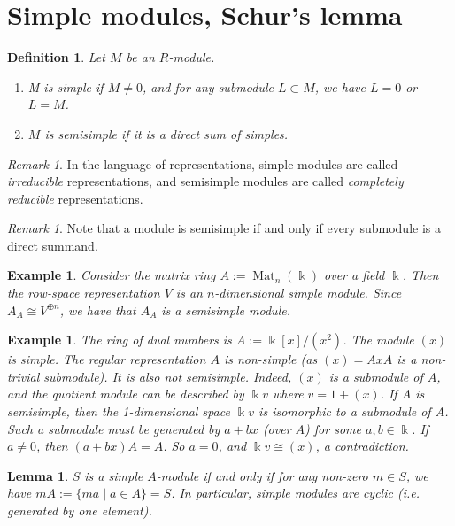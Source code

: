 \documentclass[11pt,a4paper]{article}
\makeatletter
\numberwithin{equation}{section}
\renewenvironment{proof}[1][\proofname]{\par
    \pushQED{\qed}%
    \normalfont \topsep0\p@\@plus6\p@ \labelsep1em\relax
    \trivlist
    \item[\hskip\labelsep\indent
        \bfseries #1]\ignorespaces
    \mbox{}
}{
    \popQED\endtrivlist\@endpefalse
}
\theoremstyle{all}
\newtheorem{lemma}[theorem]{Lemma}
\newtheorem{example}[theorem]{Example}
\newtheorem{definition}[theorem]{Definition}
\theoremstyle{remark}
\newtheorem{remark}[theorem]{Remark}
\newcommand{\Mat}{\operatorname{Mat}\nolimits}
\newcommand{\defn}[1]{\textsl{\color{darkblue} #1}}
\makeatother
\begin{document}
\section{Simple modules, Schur's lemma}
\begin{definition}
Let $M$ be an $R$-module.
\begin{enumerate}
\item M is \defn{simple} if $M\neq 0$, and for any submodule $L\subset M$, we have $L=0$ or $L=M$.

\item $M$ is \defn{semisimple} if it is a direct sum of simples.
\end{enumerate}
\end{definition}
\begin{remark}
In the language of representations, simple modules are called \defn{irreducible} representations, and semisimple modules are called \defn{completely reducible} representations.
\end{remark}
\begin{remark}
Note that a module is semisimple if and only if every submodule is a direct summand.
\end{remark}

\begin{example}
Consider the matrix ring $A:=\Mat_n(\Bbbk)$ over a field $\Bbbk$.  Then the row-space representation $V$ is an $n$-dimensional simple module.  Since $A_A\cong V^{\oplus n}$, we have that $A_A$ is a semisimple module.
\end{example}

\begin{example}
The \defn{ring of dual numbers} is $A:=\Bbbk[x]/(x^2)$.  The module $(x)$ is simple.  The regular representation $A$ is non-simple (as $(x)=AxA$ is a non-trivial submodule).  It is also not semisimple.  Indeed, $(x)$ is a submodule of $A$, and the quotient module can be described by $\Bbbk v$ where $v=1+(x)$.  If $A$ is semisimple, then the 1-dimensional space $\Bbbk v$ is isomorphic to a submodule of $A$.  Such a submodule must be generated by $a+bx$ (over $A$) for some $a,b\in \Bbbk$.  If $a\neq 0$, then $(a+bx)A=A$.  So $a=0$, and $\Bbbk v\cong (x)$, a contradiction.
\end{example}

\begin{lemma}
$S$ is a simple $A$-module if and only if for any non-zero $m\in S$, we have $mA:=\{ma\mid a\in A\}=S$.  In particular, simple modules are cyclic (i.e. generated by one element).
\end{lemma}
%
\end{document}

